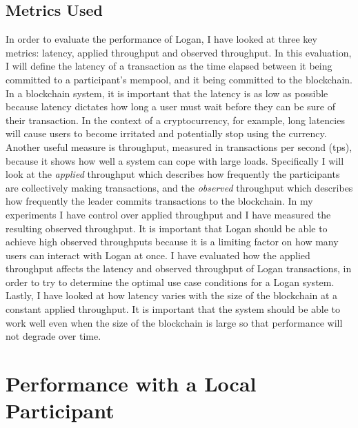 \documentclass[12pt,a4paper,twoside,openright]{report}
\begin{document}
	\subsection*{Metrics Used}
	In order to evaluate the performance of Logan, I have looked at three key metrics: latency, applied throughput and observed throughput.
	In this evaluation, I will define the latency of a transaction as the time elapsed between it being committed to a participant's mempool, and it being committed to the blockchain.
	In a blockchain system, it is important that the latency is as low as possible because latency dictates how long a user must wait before they can be sure of their transaction.
	In the context of a cryptocurrency, for example, long latencies will cause users to become irritated and potentially stop using the currency.
	Another useful measure is throughput, measured in transactions per second (tps), because it shows how well a system can cope with large loads.
	Specifically I will look at the \textit{applied} throughput which describes how frequently the participants are collectively making transactions, and the \textit{observed} throughput which describes how frequently the leader commits transactions to the blockchain.
	In my experiments I have control over applied throughput and I have measured the resulting observed throughput.
	It is important that Logan should be able to achieve high observed throughputs because it is a limiting factor on how many users can interact with Logan at once.
	I have evaluated how the applied throughput affects the latency and observed throughput of Logan transactions, in order to try to determine the optimal use case conditions for a Logan system.
	Lastly, I have looked at how latency varies with the size of the blockchain at a constant applied throughput.
	It is important that the system should be able to work well even when the size of the blockchain is large so that performance will not degrade over time.
	
	\section{Performance with a Local Participant}
\end{document}
